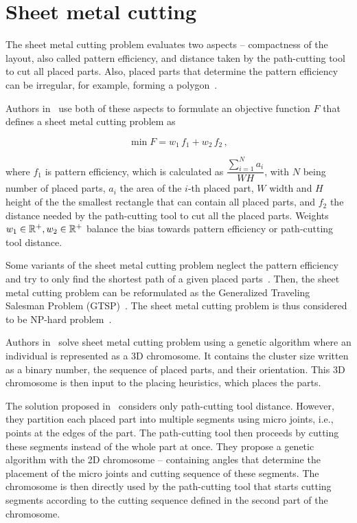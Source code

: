 \section{Sheet metal cutting}\label{sec:sheet-metal-cutting}

The sheet metal cutting problem evaluates two aspects – compactness of the layout, also called pattern efficiency, and distance taken
by the path-cutting tool to cut all placed parts.
Also, placed parts that determine the pattern efficiency can be irregular, for example, forming a polygon~\cite{hajadLaserCuttingPath2019}.

Authors in~\cite{vijayanandHeuristicGeneticApproach2015}
use both of these aspects to formulate an objective function $F$ that defines a sheet metal cutting problem as

\begin{equation}
    \min F = w_1\,f_1 + w_2\,f_{2}\,,
    \label{eq:metal-sheet-cutting}
\end{equation}

where $f_1$ is pattern efficiency, which is calculated as $\dfrac{\sum\limits_{i=1}^{N}a_i}{WH}$,
with $N$ being number of placed parts, $a_i$ the area of the $i$-th placed part, $W$ width and $H$ height of the
the smallest rectangle that can contain all placed parts, and $f_2$ the distance
needed by the path-cutting tool to cut all the placed parts.
Weights $w_1 \in \operatorname*{\mathbb{R}^+}, w_2 \in \operatorname*{\mathbb{R}^+}$ balance the bias towards pattern efficiency or path-cutting tool distance.

Some variants of the sheet metal cutting problem neglect the pattern efficiency and try to only find the shortest
path of a given placed parts~\cite{kandasamyEffectiveLocationMicro2020}.
Then, the sheet metal cutting problem can be reformulated as the Generalized Traveling Salesman Problem (GTSP)~\cite{hajadLaserCuttingPath2019}.
The sheet metal cutting problem is thus considered to be NP-hard problem~\cite{vijayanandHeuristicGeneticApproach2015}.

Authors in~\cite{vijayanandHeuristicGeneticApproach2015} solve sheet metal cutting problem using a genetic algorithm
where an individual is represented as a 3D chromosome.
It contains the cluster size written as a binary number, the sequence of placed parts, and their orientation.
This 3D chromosome is then input to the placing heuristics, which places the parts.

The solution proposed in~\cite{kandasamyEffectiveLocationMicro2020} considers only path-cutting tool distance.
However, they partition each placed part into multiple segments using micro joints, i.e., points at the edges of the part.
The path-cutting tool then proceeds by cutting these segments instead of the whole part at once.
They propose a genetic algorithm with the 2D chromosome – containing angles that determine the placement of the micro joints and cutting sequence of these segments.
The chromosome is then directly used by the path-cutting tool that starts cutting segments according to the cutting sequence defined in the second part of the chromosome.